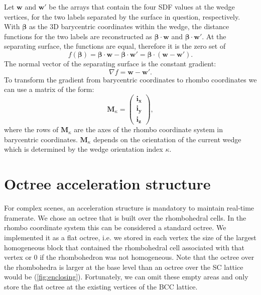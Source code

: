 \documentclass[journal]{vgtc}                     %
\begin{document}
Let $\mathbf{w}$ and $\mathbf{w}'$ be the arrays that contain the four SDF values at the wedge vertices, for the two labels separated by the surface in question, respectively. With $\mathbf{\beta}$ as the 3D barycentric coordinates within the wedge, the distance functions for the two labels are reconstructed as $\mathbf{\beta} \cdot \mathbf{w}$ and $\mathbf{\beta} \cdot \mathbf{w}'$. At the separating surface, the functions are equal, therefore it is the zero set of 
\begin{equation}
	f(\mathbf{\beta}) = \mathbf{\beta} \cdot \mathbf{w} - \mathbf{\beta} \cdot \mathbf{w}' = \mathbf{\beta} \cdot (\mathbf{w} - \mathbf{w}').
\end{equation}
The normal vector of the separating surface is the constant gradient:
\begin{equation}
	\nabla f = \mathbf{w} - \mathbf{w}'.
\end{equation}
To transform the gradient from barycentric coordinates to rhombo coordinates we can use a matrix of the form:
\begin{equation}
	\mathbf{M}_{\kappa} =
	\left(
	\begin{array}{ccc}
		\mathbf{i_x} \\
		\mathbf{i_y} \\
		\mathbf{i_z}
	\end{array}
	\right),
\end{equation}
where the rows of $\mathbf{M}_{\kappa}$ are the axes of the rhombo coordinate system in barycentric coordinates. $\mathbf{M}_{\kappa}$ depends on the orientation of the current wedge which is determined by the wedge orientation index $\kappa$.

\section{Octree acceleration structure} \label{sec:octree}

For complex scenes, an acceleration structure is mandatory to maintain real-time framerate. We chose an octree that is built over the rhombohedral cells. In the rhombo coordinate system this can be considered a standard octree. We implemented it as a flat octree, i.e. we stored in each vertex the size of the largest homogeneous block that contained the rhombohedral cell associated with that vertex or 0 if the rhombohedron was not homogeneous. Note that the octree over the rhombohedra is larger at the base level than an octree over the SC lattice would be (\cref{fig:enclosing}). Fortunately, we can omit these empty areas and only store the flat octree at the existing vertices of the BCC lattice.
\end{document}
